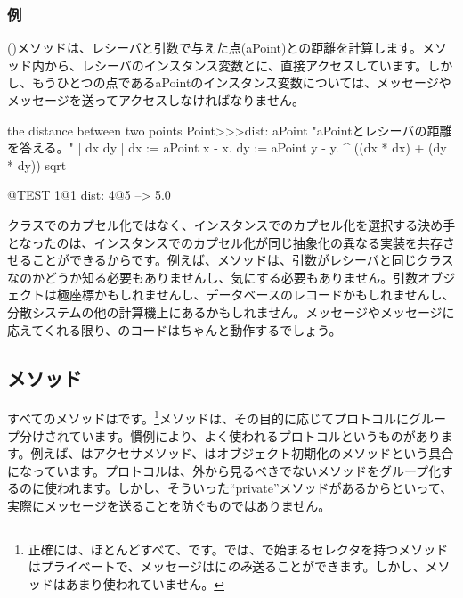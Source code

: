 \documentclass[a4paper,10pt,twoside]{book}
\begin{document}
\subsubsection{例}
 ()メソッドは、レシーバと引数で与えた点(aPoint)との距離を計算します。メソッド内から、レシーバのインスタンス変数とに、直接アクセスしています。しかし、もうひとつの点であるaPointのインスタンス変数については、メッセージやメッセージを送ってアクセスしなければなりません。

\begin{method}[dist:]{the distance between two points}
Point>>>dist: aPoint 
	"aPointとレシーバの距離を答える。"  
	| dx dy |
	dx := aPoint x - x.
	dy :=  aPoint y - y.
	^ ((dx * dx) + (dy * dy)) sqrt
\end{method}

\begin{code}{@TEST}
1@1 dist: 4@5 --> 5.0
\end{code}

クラスでのカプセル化ではなく、インスタンスでのカプセル化を選択する決め手となったのは、インスタンスでのカプセル化が同じ抽象化の異なる実装を共存させることができるからです。例えば、メソッドは、引数がレシーバと同じクラスなのかどうか知る必要もありませんし、気にする必要もありません。引数オブジェクトは極座標かもしれませんし、データベースのレコードかもしれませんし、分散システムの他の計算機上にあるかもしれません。メッセージやメッセージに応えてくれる限り、のコードはちゃんと動作するでしょう。

\subsection{メソッド}

すべてのメソッドはです。\footnote{正確には、ほとんどすべて、です。\pharo では、で始まるセレクタを持つメソッドはプライベートで、メッセージは\self に\emph{のみ}送ることができます。しかし、メソッドはあまり使われていません。}メソッドは、その目的に応じてプロトコルにグループ分けされています。慣例により、よく使われるプロトコルというものがあります。例えば、はアクセサメソッド、はオブジェクト初期化のメソッドという具合になっています。プロトコルは、外から見るべきでないメソッドをグループ化するのに使われます。しかし、そういった``private''メソッドがあるからといって、実際にメッセージを送ることを防ぐものではありません。
\end{document}
